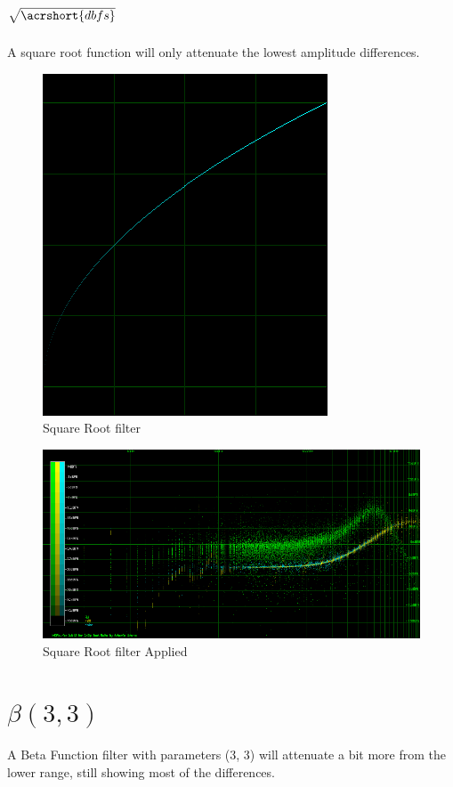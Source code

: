 \documentclass[10pt,a4paper]{report}
\begin{document}
\begin{appendices}
\section{$\sqrt{\acrshort{dbfs}}$} 

A square root function will only attenuate the lowest amplitude differences.

\begin{figure}[H]
	\centering
	\includegraphics[width=0.4\linewidth]{images/colorfilter/BetaFunctionPlot_1.png}
	\caption[Square Root filter]{Square Root filter}
	\label{fig:betafunctionplot1}
\end{figure}

\begin{figure}[H]
	\centering
	\includegraphics[width=1\linewidth]{images/colorfilter/BetaFunctionPlot_1_Data.png}
	\caption[Square Root filter]{Square Root filter Applied}
	\label{fig:betafunctionplot1data}
\end{figure}

\section{$\beta(3,3)$}

A Beta Function filter with parameters (3, 3) will attenuate a bit more from the lower range, still showing most of the differences.


\end{appendices}
\end{document}

